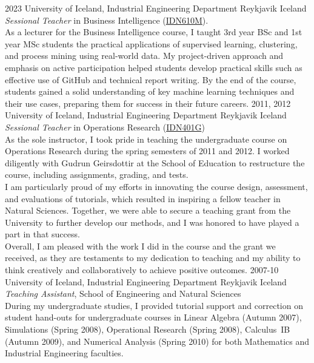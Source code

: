 \begin{entrylist}
\entry
{2023}
{University of Iceland, Industrial Engineering Department}
{Reykjavik Iceland}
{\emph{Sessional Teacher} in Business Intelligence (\href{https://ugla.hi.is/kennsluskra/index.php?tab=nam&chapter=namskeid&id=71001420230}{IDN610M}). \\
As a lecturer for the Business Intelligence course, I taught 3rd year BSc and 1st year MSc students the practical
applications of supervised learning, clustering, and process mining using real-world data. My project-driven approach
and emphasis on active participation helped students develop practical skills such as effective use of GitHub and technical report writing. By the end of the course, students gained a solid understanding of key machine learning techniques and their use cases, preparing them for success in their future careers.
}
\entry
{2011, 2012}
{University of Iceland, Industrial Engineering Department}
{Reykjavik Iceland}
{\emph{Sessional Teacher} in Operations Research (\href{https://ugla.hi.is/kennsluskra/index.php?sid=&tab=nam&chapter=namskeid&id=08213020110}{IDN401G})\\
As the sole instructor, I took pride in teaching the undergraduate course on Operations Research during the spring semesters of 2011 and 2012. I worked diligently with Gudrun Geirsdottir at the School of Education to restructure the course, including assignments, grading, and tests.\\
I am particularly proud of my efforts in innovating the course design, assessment, and evaluations of tutorials, which resulted in inspiring a fellow teacher in Natural Sciences. Together, we were able to secure a teaching grant from the University to further develop our methods, and I was honored to have played a part in that success.\\
Overall, I am pleased with the work I did in the course and the grant we received, as they are testaments to my dedication to teaching and my ability to think creatively and collaboratively to achieve positive outcomes.
}	
\entry
{2007-10}
{University of Iceland, Industrial Engineering Department}
{Reykjavik Iceland}
{\emph{Teaching Assistant}, School of Engineering and Natural Sciences \\
During my undergraduate studies, I provided tutorial support and correction on student hand-outs for undergraduate courses in Linear Algebra (Autumn 2007), Simulations (Spring 2008), Operational Research (Spring 2008), Calculus~IB (Autumn 2009), and Numerical Analysis (Spring 2010) for both Mathematics and Industrial Engineering faculties.}
\end{entrylist}   
